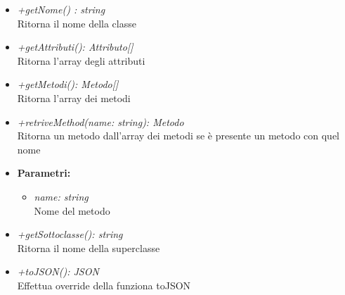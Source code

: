 \begin{itemize}
\begin{itemize}
            			\item \emph{+getNome() : string}\\
            			Ritorna il nome della classe
            			\item \emph{+getAttributi(): Attributo[]}\\
            			Ritorna l'array degli attributi
            			\item \emph{+getMetodi(): Metodo[]}\\
            			Ritorna l'array dei metodi
            			\item \emph{+retriveMethod(name: string): Metodo}\\
            			Ritorna un metodo dall'array dei metodi se è presente un metodo con quel nome
            			\item \textbf{Parametri:}\\
            				\begin{itemize}
            					\item \emph{name: string}\\
            					Nome del metodo
            				\end{itemize}
            			\item \emph{+getSottoclasse(): string}\\
            			Ritorna il nome della superclasse
            			\item \emph{+toJSON(): JSON}\\ 
            			Effettua override della funziona toJSON
          			\end{itemize}
          		\end{itemize}
